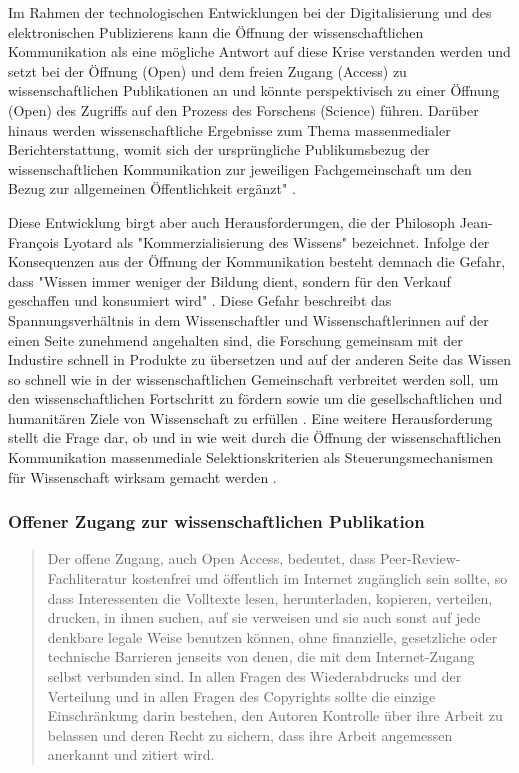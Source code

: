 Im Rahmen der technologischen Entwicklungen bei der Digitalisierung und des elektronischen Publizierens kann die Öffnung der wissenschaftlichen Kommunikation als eine mögliche Antwort auf diese Krise verstanden werden und setzt bei der Öffnung (Open) und dem freien Zugang (Access) zu wissenschaftlichen Publikationen an und könnte perspektivisch zu einer Öffnung (Open) des Zugriffs auf den Prozess des Forschens (Science) führen. Darüber hinaus werden wissenschaftliche Ergebnisse zum Thema massenmedialer Berichterstattung, womit sich der ursprüngliche Publikumsbezug der wissenschaftlichen Kommunikation zur jeweiligen Fachgemeinschaft um den Bezug zur allgemeinen Öffentlichkeit ergänzt" \cite{bbaw_publizieren_2015} .

Diese Entwicklung birgt aber auch Herausforderungen, die der Philosoph Jean-François Lyotard als "Kommerzialisierung des Wissens" \cite{lyotard_1993_postmoderne} bezeichnet. Infolge der Konsequenzen aus der Öffnung der Kommunikation besteht demnach die Gefahr, dass "Wissen immer weniger der Bildung dient, sondern für den Verkauf geschaffen und konsumiert wird" \cite{hagner_2015_sache_buches}. Diese Gefahr beschreibt das Spannungsverhältnis in dem Wissenschaftler und Wissenschaftlerinnen auf der einen Seite zunehmend angehalten sind, die Forschung gemeinsam mit der Industire schnell in Produkte zu übersetzen und auf der anderen Seite das Wissen so schnell wie in der wissenschaftlichen Gemeinschaft verbreitet werden soll, um den wissenschaftlichen Fortschritt zu fördern sowie um die gesellschaftlichen und humanitären Ziele von Wissenschaft zu erfüllen \cite{harmon_2012_commercialization} \cite{Woelfle_2011}. Eine weitere Herausforderung stellt die Frage dar, ob und in wie weit durch die Öffnung der wissenschaftlichen Kommunikation massenmediale Selektionskriterien als Steuerungsmechanismen für Wissenschaft wirksam gemacht werden \cite{bbaw_publizieren_2015}.

\subsubsection{Offener Zugang zur wissenschaftlichen Publikation}

\begin{quote}
Der offene Zugang, auch Open Access, bedeutet, dass Peer-Review-Fachliteratur kostenfrei und öffentlich im Internet zugänglich sein sollte, so dass Interessenten die Volltexte lesen, herunterladen, kopieren, verteilen, drucken, in ihnen suchen, auf sie verweisen und sie auch sonst auf jede denkbare legale Weise benutzen können, ohne finanzielle, gesetzliche oder technische Barrieren jenseits von denen, die mit dem Internet-Zugang selbst verbunden sind. In allen Fragen des Wiederabdrucks und der Verteilung und in allen Fragen des Copyrights sollte die einzige Einschränkung darin bestehen, den Autoren Kontrolle über ihre Arbeit zu belassen und deren Recht zu sichern, dass ihre Arbeit angemessen anerkannt und zitiert wird.
\cite{boai_2012}
\end{quote}

